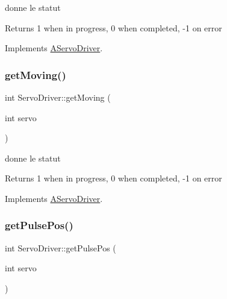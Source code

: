 donne le statut 

\begin{DoxyReturn}{Returns}
1 when in progress, 0 when completed, -\/1 on error 
\end{DoxyReturn}


Implements \hyperlink{classAServoDriver_a954ac7340407b997387d84d7059ed32b}{A\+Servo\+Driver}.

\mbox{\label{classServoDriver_a0a8e84f0bbcff39549ddfc239f1a6237}} 
\subsubsection{\texorpdfstring{get\+Moving()}{getMoving()}\hspace{0.1cm}{\footnotesize\ttfamily [6/6]}}
{\footnotesize\ttfamily int Servo\+Driver\+::get\+Moving (\begin{DoxyParamCaption}\item[{int}]{servo }\end{DoxyParamCaption})\hspace{0.3cm}{\ttfamily [virtual]}}



donne le statut 

\begin{DoxyReturn}{Returns}
1 when in progress, 0 when completed, -\/1 on error 
\end{DoxyReturn}


Implements \hyperlink{classAServoDriver_a954ac7340407b997387d84d7059ed32b}{A\+Servo\+Driver}.

\mbox{\label{classServoDriver_a716d64d7b2203c9cb8dff5c90d0a5dd9}} 
\subsubsection{\texorpdfstring{get\+Pulse\+Pos()}{getPulsePos()}}
{\footnotesize\ttfamily int Servo\+Driver\+::get\+Pulse\+Pos (\begin{DoxyParamCaption}\item[{int}]{servo }\end{DoxyParamCaption})\hspace{0.3cm}{\ttfamily [virtual]}}



